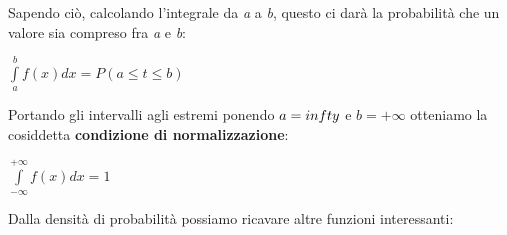 \documentclass[11pt]{book}
\begin{document}
Sapendo ci\`o, calcolando l'integrale da {\em a} a {\em b}, questo ci
dar\`a la probabilit\`a che un valore sia compreso fra {\em a} e {\em
  b}:

\begin{center}
$\int\limits_{a}^b f(x)dx = P(a\leq t \leq b)$  
\end{center}

Portando gli intervalli agli estremi ponendo $a = \-infty$ e $b =
+\infty$ otteniamo la cosiddetta {\bf condizione di normalizzazione}:

\begin{center}
$\int\limits_{-\infty}^{+\infty} f(x)dx = 1$
\end{center}

Dalla densit\`a di probabilit\`a possiamo ricavare altre funzioni
interessanti:
\end{document}
